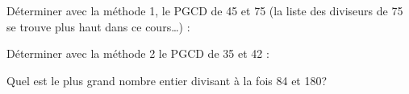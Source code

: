 \begin{methode*1}
\exercice  
Déterminer avec la méthode 1, le PGCD de 45 et 75 (la liste des diviseurs de 75 se trouve plus haut dans ce cours…) :

\dotfill

\dotfill

\dotfill

\exercice  
Déterminer avec la méthode 2 le PGCD de 35 et 42 :

\dotfill

\dotfill

\dotfill

\exercice  
Quel est le plus grand nombre entier divisant à la fois 84 et 180?

\dotfill

\dotfill

\dotfill

 \end{methode*1}
 
 
